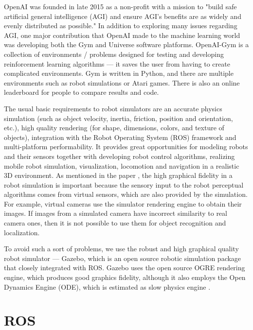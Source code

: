 
OpenAI was founded in late 2015 as a non-profit with a mission to "build safe artificial general intelligence (AGI) and ensure AGI's benefits are as widely and evenly distributed as possible." In addition to exploring many issues regarding AGI, one major contribution that OpenAI made to the machine learning world was developing both the Gym and Universe software platforms. OpenAI-Gym is a collection of environments / problems designed for testing and developing reinforcement learning algorithms --- it saves the user from having to create complicated environments. Gym is written in Python, and there are multiple environments such as robot simulations or Atari games. There is also an online leaderboard for people to compare results and code.



The usual basic requirements to robot simulators are an accurate physics simulation (such as object velocity, inertia, friction, position and orientation, etc.), high quality rendering (for shape, dimensions, colors, and texture of objects), integration with the Robot Operating System (ROS) framework and multi-platform performability. It provides great opportunities for modeling robots and their sensors together with developing robot control algorithms, realizing mobile robot simulation, visualization, locomotion and navigation in a realistic 3D environment. As mentioned in the paper \cite{jmeSim2012}, the high graphical fidelity in a robot simulation is important because the sensory input to the robot perceptual algorithms comes from virtual sensors, which are also provided by the simulation. For example, virtual cameras use the simulator rendering engine to obtain their images. If images from a simulated camera have incorrect similarity to real camera ones, then it is not possible to use them for object recognition and localization.

To avoid such a sort of problems, we use the robust and high graphical quality robot simulator --- Gazebo, which is an open source robotic simulation package that closely integrated with ROS. Gazebo uses the open source OGRE rendering engine, which produces good graphics fidelity, although it also employs the Open Dynamics Engine (ODE), which is estimated as slow physics engine \cite{jmeSim2012}.

\section{ROS}


